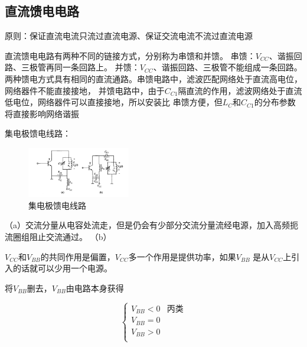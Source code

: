 \documentclass[10pt]{article}
\begin{document}
\subsection{直流馈电电路}
原则：保证直流电流只流过直流电源、保证交流电流不流过直流电源\par
直流馈电电路有两种不同的链接方式，分别称为串馈和并馈。
串馈：$V_{CC}$、谐振回路、三极管再同一条回路上。
并馈：$V_{CC}$、谐振回路、三极管不能组成一条回路。
两种馈电方式具有相同的直流通路。串馈电路中，滤波匹配网络处于直流高电位，网络器件不能直接接地，
并馈电路中，由于$C_{C1}$隔直流的作用，滤波网络处于直流低电位，网络器件可以直接接地，所以安装比
串馈方便，但$L_{C}$和$C_{C1}$的分布参数将直接影响网络谐振
\begin{example}
    集电极馈电线路：
 \begin{figure}[H] %
  \centering %
  \includegraphics[width=0.4\textwidth]{pictures/2-3.png} %
  \caption{集电极馈电线路} %
  \label{fig.2-3}%
 \end{figure}
 （a）交流分量从电容处流走，但是仍会有少部分交流分量流经电源，加入高频扼流圈组阻止交流通过。
 （b）
\end{example}
$V_{CC}$和$V_{BB}$的共同作用是偏置，$V_{CC}$多一个作用是提供功率，如果$V_{BB}$
是从$V_{CC}$上引入的话就可以少用一个电源。\par
将$V_{BB}$删去，$V_{BB}$由电路本身获得

$$
\left\{  
    \begin{array}{cc}  
        V_{BB} < 0 & \text{丙类}\\  
        V_{BB} = 0\\  
        V_{BB} > 0\\    
    \end{array}  
\right.  
$$
\end{document}
